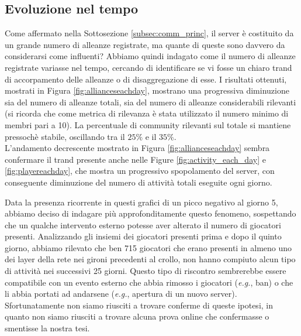 \newpage
\subsection{Evoluzione nel tempo}
\label{subsec:eot}
Come affermato nella Sottosezione \ref{subsec:comm_princ}, il server è costituito da un grande numero di alleanze registrate, ma quante di queste sono davvero da considerarsi come influenti? Abbiamo quindi indagato come il numero di alleanze registrate variasse nel tempo, cercando di identificare se vi fosse un chiaro trand di accorpamento delle alleanze o di disaggregazione di esse. I risultati ottenuti, mostrati in Figura \ref{fig:allianceseachday}, mostrano una progressiva diminuzione sia del numero di alleanze totali, sia del numero di alleanze considerabili rilevanti (si ricorda che come metrica di rilevanza è stata utilizzato il numero minimo di membri pari a 10). La percentuale di community rilevanti sul totale si mantiene pressochè stabile, oscillando tra il $25\%$ e il $35\%$.\\
L'andamento decrescente mostrato in Figura \ref{fig:allianceseachday} sembra confermare il trand presente anche nelle Figure \ref{fig:activity_each_day} e \ref{fig:playereachday}, che mostra un progressivo spopolamento del server, con conseguente diminuzione del numero di attività totali eseguite ogni giorno.

Data la presenza ricorrente in questi grafici di un picco negativo al giorno 5, abbiamo deciso di indagare più approfonditamente questo fenomeno, sospettando che un qualche intervento esterno potesse aver alterato il numero di giocatori presenti. Analizzando gli insiemi dei giocatori presenti prima e dopo il quinto giorno, abbiamo rilevato che ben 715 giocatori che erano presenti in almeno uno dei layer della rete nei gironi precedenti al crollo, non hanno compiuto alcun tipo di attività nei successivi 25 giorni. Questo tipo di riscontro sembrerebbe essere compatibile con un evento esterno che abbia rimosso i giocatori (\textit{e.g.}, ban) o che li abbia portati ad andarsene (\textit{e.g.}, apertura di un nuovo server). Sfortunatamente non siamo riusciti a trovare conferme di queste ipotesi, in quanto non siamo riusciti a trovare alcuna prova online che confermasse o smentisse la nostra tesi.

